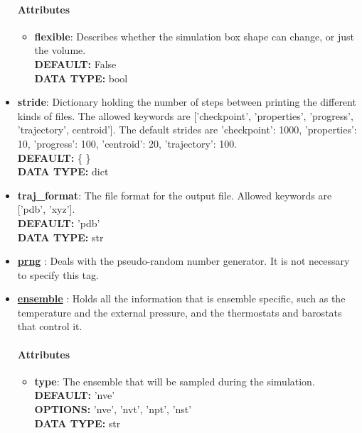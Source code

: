 \begin{itemize}
\paragraph{Attributes}
 \begin{itemize}
\item {\bf flexible}:
 Describes whether the simulation box shape can change, or just the volume.
{\\ \bf DEFAULT: }False
{\\ \bf DATA TYPE: }bool
\end{itemize}
 
\item {\bf stride}:
 Dictionary holding the number of steps between printing the different kinds of files. The allowed keywords are ['checkpoint', 'properties', 'progress', 'trajectory', centroid']. The default strides are {'checkpoint': 1000, 'properties': 10, 'progress': 100, 'centroid': 20, 'trajectory': 100}.
{\\ \bf DEFAULT: }\{ \}
{\\ \bf DATA TYPE: }dict
\item {\bf traj\_format}:
 The file format for the output file. Allowed keywords are ['pdb', 'xyz'].
{\\ \bf DEFAULT: }'pdb'
{\\ \bf DATA TYPE: }str
\item {\bf \hyperref[RANDOM]{prng} }:
 Deals with the pseudo-random number generator. It is not necessary to specify this tag.
\item {\bf \hyperref[ENSEMBLE]{ensemble} }:
 Holds all the information that is ensemble specific, such as the temperature and the external pressure, and the thermostats and barostats that control it.
\paragraph{Attributes}
 \begin{itemize}
\item {\bf type}:
 The ensemble that will be sampled during the simulation.
{\\ \bf DEFAULT: }'nve'
{\\ \bf OPTIONS: }'nve', 'nvt', 'npt', 'nst'
{\\ \bf DATA TYPE: }str
\end{itemize}
 
\end{itemize}
 
